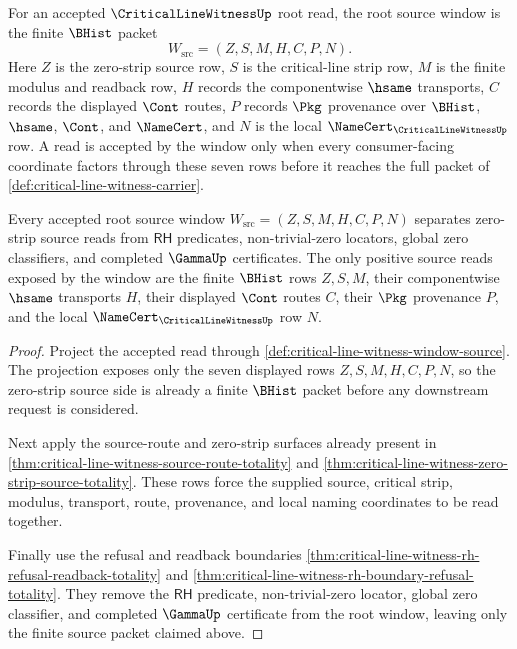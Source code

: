 \begin{definition}
\label{def:critical-line-witness-window-source}
For an accepted $\CriticalLineWitnessUp$ root read, the root source window is
the finite $\BHist$ packet
$$
W_{\mathrm{src}}=(Z,S,M,H,C,P,N).
$$
Here $Z$ is the zero-strip source row, $S$ is the critical-line strip row, $M$
is the finite modulus and readback row, $H$ records the componentwise $\hsame$
transports, $C$ records the displayed $\Cont$ routes, $P$ records $\Pkg$
provenance over $\BHist$, $\hsame$, $\Cont$, and $\NameCert$, and $N$ is the
local $\NameCert_{\CriticalLineWitnessUp}$ row. A read is accepted by the
window only when every consumer-facing coordinate factors through these seven
rows before it reaches the full packet of \autoref{def:critical-line-witness-carrier}.
\end{definition}

\begin{theorem}
\label{thm:critical-line-witness-zero-strip-separation}
Every accepted root source window
$W_{\mathrm{src}}=(Z,S,M,H,C,P,N)$ separates zero-strip source reads from
$\mathsf{RH}$ predicates, non-trivial-zero locators, global zero classifiers,
and completed $\GammaUp$ certificates. The only positive source reads exposed
by the window are the finite $\BHist$ rows $Z,S,M$, their componentwise
$\hsame$ transports $H$, their displayed $\Cont$ routes $C$, their $\Pkg$
provenance $P$, and the local $\NameCert_{\CriticalLineWitnessUp}$ row $N$.
\end{theorem}
\begin{proof}
Project the accepted read through
\autoref{def:critical-line-witness-window-source}. The projection exposes
only the seven displayed rows $Z,S,M,H,C,P,N$, so the zero-strip source side is
already a finite $\BHist$ packet before any downstream request is considered.

Next apply the source-route and zero-strip surfaces already present in
\autoref{thm:critical-line-witness-source-route-totality} and
\autoref{thm:critical-line-witness-zero-strip-source-totality}. These rows
force the supplied source, critical strip, modulus, transport, route,
provenance, and local naming coordinates to be read together.

Finally use the refusal and readback boundaries
\autoref{thm:critical-line-witness-rh-refusal-readback-totality} and
\autoref{thm:critical-line-witness-rh-boundary-refusal-totality}. They remove
the $\mathsf{RH}$ predicate, non-trivial-zero locator, global zero classifier,
and completed $\GammaUp$ certificate from the root window, leaving only the
finite source packet claimed above.
\end{proof}

